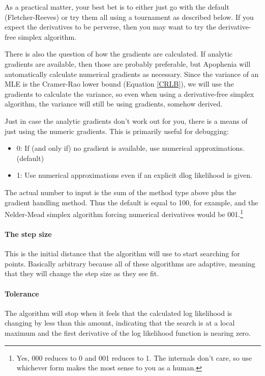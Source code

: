 As a practical matter, your best bet is to either just go with the default (Fletcher-Reeves) or try them all using a tournament as described below. 
If you expect the derivatives to be perverse, then you may want to try the derivative-free simplex algorithm.

There is also the question of how the gradients are calculated. If
analytic gradients are available, then those are probably preferable, but
Apophenia will automatically calculate numerical gradients as necessary.
Since the variance of an MLE is the Cramer-Rao lower bound (Equation
\ref{CRLB}), we will use
the gradients to calculate the variance, so even when using a
derivative-free simplex algorithm, the variance will still be using
gradients, somehow derived.

Just in case the analytic gradients don't work out for you, there is a
means of just using the numeric gradients. This is primarily useful for debugging:

\begin{itemize}
\item 0: If (and only if) no gradient is available, use numerical approximations.  (default)
\item 1: Use numerical approximations even if an explicit dlog likelihood is given. 
\end{itemize}

The actual number to input is the sum of the method type above plus the
gradient handling method. Thus the default is equal to 100, for example, and the
Nelder-Mead simplex algorithm forcing numerical derivatives would be
001.\footnote{Yes, 000 reduces to 0 and 001 reduces to 1. The internals
don't care, so use whichever form makes the most sense to you as a human.}


\paragraph{The step size} This is the initial distance that the
algorithm will use to start searching for points. Basically arbitrary
because all of these algorithms are adaptive, meaning that they will
change the step size as they see fit.

\paragraph{Tolerance} The algorithm will stop when it feels
that the calculated log likelihood is changing by less than this amount,
indicating that the search is at a local maximum and the first derivative of
the log likelihood function is nearing zero.

